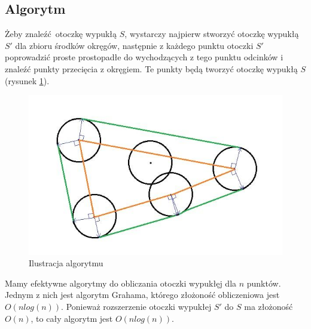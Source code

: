 \documentclass[12pt, a4paper]{article}
\begin{document}
\subsection*{Algorytm}

Żeby znaleźć otoczkę wypukłą $S$, wystarczy najpierw stworzyć otoczkę wypukłą $S'$ dla zbioru
środków okręgów, następnie z każdego punktu otoczki $S'$ poprowadzić proste prostopadłe do wychodzących
z tego punktu odcinków i znaleźć punkty przecięcia z okręgiem. Te punkty będą tworzyć otoczkę wypukłą $S$ (rysunek \ref{fig:img2}).

\begin{figure}[H]
  \begin{center}
  \includegraphics[scale=0.65]{Img2}
  \caption{Ilustracja algorytmu}
  \label{fig:img2}
  \end{center}
\end{figure}

Mamy efektywne algorytmy do obliczania otoczki wypukłęj dla $n$ punktów. Jednym
z nich jest algorytm Grahama, którego złożoność obliczeniowa jest $O(nlog(n))$.
Ponieważ rozszerzenie otoczki wypukłej $S'$ do $S$ ma złożoność $O(n)$, to cały algorytm jest $O(nlog(n))$.
\end{document}
